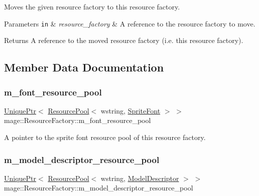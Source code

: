Moves the given resource factory to this resource factory.


\begin{DoxyParams}[1]{Parameters}
\mbox{\tt in}  & {\em resource\+\_\+factory} & A reference to the resource factory to move. \\
\hline
\end{DoxyParams}
\begin{DoxyReturn}{Returns}
A reference to the moved resource factory (i.\+e. this resource factory). 
\end{DoxyReturn}


\subsection{Member Data Documentation}
\hypertarget{classmage_1_1_resource_factory_a22db66fbf8dc004124c724770007f056}{}\label{classmage_1_1_resource_factory_a22db66fbf8dc004124c724770007f056} 
\subsubsection{\texorpdfstring{m\+\_\+font\+\_\+resource\+\_\+pool}{m\_font\_resource\_pool}}
{\footnotesize\ttfamily \hyperlink{namespacemage_a8c307fbcc33bce9b7f2aa4c26c3b95cf}{Unique\+Ptr}$<$ \hyperlink{classmage_1_1_resource_pool}{Resource\+Pool}$<$ wstring, \hyperlink{classmage_1_1_sprite_font}{Sprite\+Font} $>$ $>$ mage\+::\+Resource\+Factory\+::m\+\_\+font\+\_\+resource\+\_\+pool\hspace{0.3cm}{\ttfamily [private]}}

A pointer to the sprite font resource pool of this resource factory. \hypertarget{classmage_1_1_resource_factory_a1739407c8918b375e7feaa2240628bde}{}\label{classmage_1_1_resource_factory_a1739407c8918b375e7feaa2240628bde} 
\subsubsection{\texorpdfstring{m\+\_\+model\+\_\+descriptor\+\_\+resource\+\_\+pool}{m\_model\_descriptor\_resource\_pool}}
{\footnotesize\ttfamily \hyperlink{namespacemage_a8c307fbcc33bce9b7f2aa4c26c3b95cf}{Unique\+Ptr}$<$ \hyperlink{classmage_1_1_resource_pool}{Resource\+Pool}$<$ wstring, \hyperlink{classmage_1_1_model_descriptor}{Model\+Descriptor} $>$ $>$ mage\+::\+Resource\+Factory\+::m\+\_\+model\+\_\+descriptor\+\_\+resource\+\_\+pool\hspace{0.3cm}{\ttfamily [private]}}

